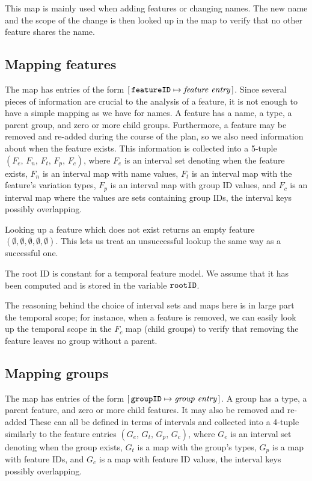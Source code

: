 This map is mainly used when adding features or changing names. The new name and the scope of the change is then looked up in the \names{} map to verify that no other feature shares the name.

\subsection{Mapping features}
\label{sub:mapping-features}

The \features{} map has entries of the form $[ \,\texttt{featureID} \mapsto \textit{feature entry}\, ]$. Since several pieces of information are crucial to the analysis of a feature, it is not enough to have a simple mapping as we have for names.
A feature has a name, a type, a parent group, and zero or more child groups. Furthermore, a feature may be removed and re-added during the course of the plan, so we also need information about when the feature exists.
This information is collected into a 5-tuple $(F_e \comma \, F_n \comma \, F_t \comma \, F_p \comma \, F_c)$, where $F_e$ is an interval set denoting when the feature exists, $F_n$ is an interval map with name values, $F_t$ is an interval map with the feature's variation types, $F_p$ is an interval map with group ID values, and $F_c$ is an interval map where the values are sets containing group IDs, the interval keys possibly overlapping.

Looking up a feature which does not exist returns an empty feature $(\emptyset \comma \emptyset \comma \emptyset \comma \emptyset \comma \emptyset)$. This lets us treat an unsuccessful lookup the same way as a successful one.

The root ID is constant for a temporal feature model. We assume that it has been computed and is stored in the variable $\texttt{rootID}$. 

The reasoning behind the choice of interval sets and maps here is in large part the temporal scope; for instance, when a feature is removed, we can easily look up the temporal scope in the $F_c$ map (child groups) to verify that removing the feature leaves no group without a parent.

\subsection{Mapping groups}
\label{sub:mapping-groups}

The \groups{} map has entries of the form $[ \,\texttt{groupID} \mapsto \textit{group entry}\, ]$. A group has a type, a parent feature, and zero or more child features. It may also be removed and re-added These can all be defined in terms of intervals and collected into a 4-tuple similarly to the feature entries $(G_e \comma \, G_t  \comma \, G_p \comma \, G_c)$, where $G_e$ is an interval set denoting when the group exists, $G_t$ is a map with the group's types, $G_p$ is a map with feature IDs, and $G_c$ is a map with feature ID values, the interval keys possibly overlapping.


